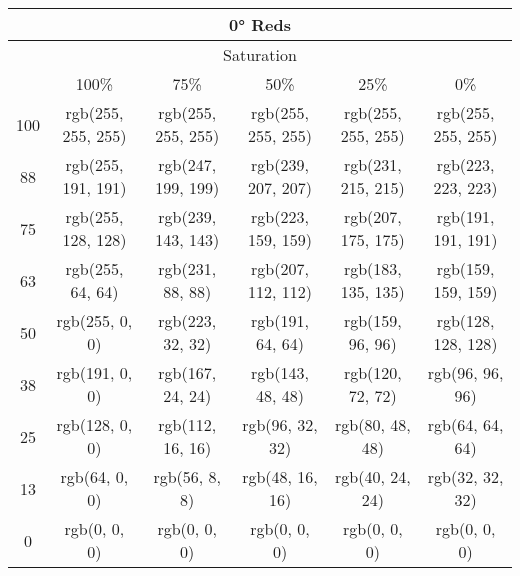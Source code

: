 \documentclass[a4j]{jarticle}
\begin{document}
\begin{tabular}{|c|c|c|c|c|c|}
 \multicolumn{6}{|c|}{0° Reds}\\\hline
 \multicolumn{6}{|c|}{Saturation}\\\hline
 &100\%&75\%&50\%&25\%&0\%\\\hline
 100&rgb(255, 255, 255)&rgb(255, 255, 255)&rgb(255, 255, 255)
             &rgb(255, 255, 255)&rgb(255, 255, 255)\\\hline
 88&rgb(255, 191, 191)&rgb(247, 199, 199)&rgb(239, 207, 207)
             &rgb(231, 215, 215)&rgb(223, 223, 223)\\\hline
 75&rgb(255, 128, 128)&rgb(239, 143, 143)&rgb(223, 159, 159)
             &rgb(207, 175, 175)&rgb(191, 191, 191)\\\hline
 63&rgb(255, 64, 64)&rgb(231, 88, 88)&rgb(207, 112, 112)
             &rgb(183, 135, 135)&rgb(159, 159, 159)\\\hline
 50&rgb(255, 0, 0)&rgb(223, 32,
         32)&rgb(191, 64, 64)&rgb(159, 96, 96)&rgb(128, 128,
                     128)\\\hline38&rgb(191, 0, 0)&rgb(167, 24,
         24)&rgb(143, 48, 48)&rgb(120, 72, 72)&rgb(96, 96,
                     96)\\\hline25&rgb(128, 0, 0)&rgb(112, 16,
         16)&rgb(96, 32, 32)&rgb(80, 48, 48)&rgb(64, 64,
                     64)\\\hline13&rgb(64, 0, 0)&rgb(56, 8, 8)&rgb(48,
             16, 16)&rgb(40, 24, 24)&rgb(32, 32, 32)\\\hline0&rgb(0, 0,
     0)&rgb(0, 0, 0)&rgb(0, 0, 0)&rgb(0, 0, 0)&rgb(0, 0, 0) 
\end{tabular}
\end{document}
